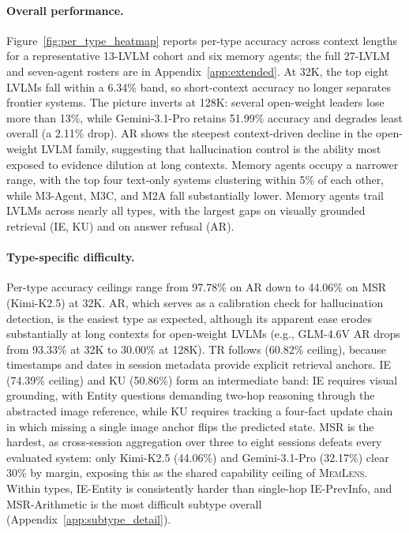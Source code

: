 \documentclass{llmxive}
\providecommand{\bench}{\textsc{MemLens}}
\begin{document}
\paragraph{Overall performance.}
Figure~\ref{fig:per_type_heatmap} reports per-type accuracy across context lengths for a representative 13-LVLM cohort and six memory agents; the full 27-LVLM and seven-agent rosters are in Appendix~\ref{app:extended}. At 32K, the top eight LVLMs fall within a 6.34\% band, so short-context accuracy no longer separates frontier systems. The picture inverts at 128K: several open-weight leaders lose more than 13\%, while Gemini-3.1-Pro retains 51.99\% accuracy and degrades least overall (a 2.11\% drop). AR shows the steepest context-driven decline in the open-weight LVLM family, suggesting that hallucination control is the ability most exposed to evidence dilution at long contexts. Memory agents occupy a narrower range, with the top four text-only systems clustering within 5\% of each other, while M3-Agent, M3C, and M2A fall substantially lower. Memory agents trail LVLMs across nearly all types, with the largest gaps on visually grounded retrieval (IE, KU) and on answer refusal (AR).

\paragraph{Type-specific difficulty.}
Per-type accuracy ceilings range from 97.78\% on AR down to 44.06\% on MSR (Kimi-K2.5) at 32K. AR, which serves as a calibration check for hallucination detection, is the easiest type as expected, although its apparent ease erodes substantially at long contexts for open-weight LVLMs (e.g., GLM-4.6V AR drops from 93.33\% at 32K to 30.00\% at 128K). TR follows (60.82\% ceiling), because timestamps and dates in session metadata provide explicit retrieval anchors. IE (74.39\% ceiling) and KU (50.86\%) form an intermediate band: IE requires visual grounding, with Entity questions demanding two-hop reasoning through the abstracted image reference, while KU requires tracking a four-fact update chain in which missing a single image anchor flips the predicted state. MSR is the hardest, as cross-session aggregation over three to eight sessions defeats every evaluated system: only Kimi-K2.5 (44.06\%) and Gemini-3.1-Pro (32.17\%) clear 30\% by margin, exposing this as the shared capability ceiling of \bench{}. Within types, IE-Entity is consistently harder than single-hop IE-PrevInfo, and MSR-Arithmetic is the most difficult subtype overall (Appendix~\ref{app:subtype_detail}).
\end{document}
